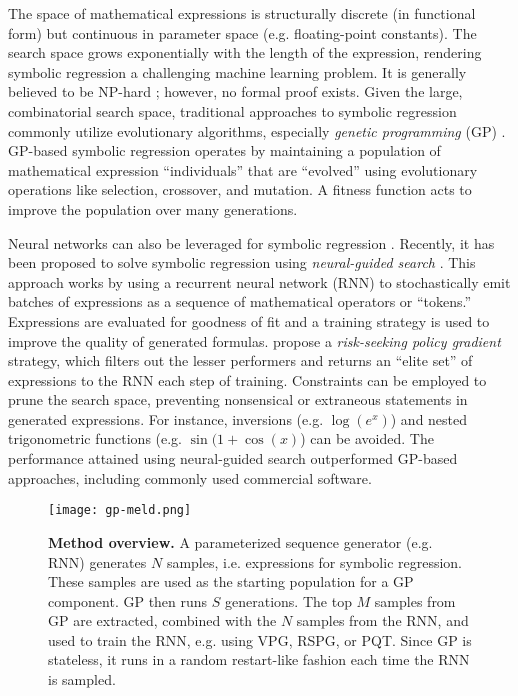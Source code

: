 \documentclass{article}
\begin{document}
The space of mathematical expressions is structurally discrete (in functional form) but continuous in parameter space (e.g. floating-point constants).
The search space grows exponentially with the length of the expression, rendering symbolic regression a challenging machine learning problem.
It is generally believed to be NP-hard \citep{lu2016using}; however, no formal proof exists.
Given the large, combinatorial search space, traditional approaches to symbolic regression commonly utilize evolutionary algorithms, especially \emph{genetic programming} (GP) \citep{koza1992genetic, schmidt2009distilling, deap2012, back2018evolutionary}.
GP-based symbolic regression operates by maintaining a population of mathematical expression ``individuals'' that are ``evolved'' using evolutionary operations like selection, crossover, and mutation.
A fitness function acts to improve the population over many generations.

Neural networks can also be leveraged for symbolic regression \citep{kusner2017grammar, sahoo2018learning, udrescu2020ai}.
Recently, it has been proposed to solve symbolic regression using \emph{neural-guided search} \citep{petersen2019deep, landajuela2021discovering}.
This approach works by using a recurrent neural network (RNN) to stochastically emit batches of expressions as a sequence of mathematical operators or ``tokens.''
Expressions are evaluated for goodness of fit and a training strategy is used to improve the quality of generated formulas.
\citet{petersen2019deep} propose a \emph{risk-seeking policy gradient} strategy, which filters out the lesser performers and returns an ``elite set'' of expressions to the RNN each step of training. 
Constraints can be employed to prune the search space, preventing nonsensical or extraneous statements in generated expressions.
For instance, inversions (e.g. $\log\left(e^x\right)$) and nested trigonometric functions (e.g. $\sin(1 + \cos(x)$) can be avoided.
The performance attained using neural-guided search outperformed GP-based approaches, including commonly used commercial software.

\begin{figure}
  \centering
  \texttt{[image: gp-meld.png]}
  \caption{\textbf{Method overview.}
  A parameterized sequence generator (e.g. RNN) generates $N$ samples, i.e. expressions for symbolic regression.
  These samples are used as the starting population for a GP component.
  GP then runs $S$ generations.
  The top $M$ samples from GP are extracted, combined with the $N$ samples from the RNN, and used to train the RNN, e.g. using VPG, RSPG, or PQT.
  Since GP is stateless, it runs in a random restart-like fashion each time the RNN is sampled.
  }
  \label{fig:gp_meld}
\end{figure}
\end{document}
